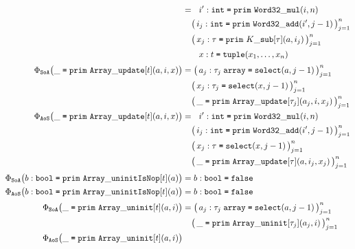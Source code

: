 \begin{figure}[htbp]
\[\begin{aligned}
      &= \phantom{\big(\,} i' : \mathtt{int} \syneq \mathtt{prim\ Word32\_mul}(i, n) \\
      &\phantom{{}=} \big(\, i_j : \mathtt{int} \syneq \mathtt{prim\ Word32\_add}(i', j-1) \,\big)_{j=1}^{n} \\
      &\phantom{{}=} \big(\, x_j : \tau \syneq \mathtt{prim}\ K\mathtt{\_sub}[\tau](a, i_j) \,\big)_{j=1}^{n} \\
      &\phantom{{}= \big(\,} x : t \syneq \mathtt{tuple}(x_1, \dots, x_n) \\[2pt]
    \Phi_{\texttt{SoA}}\big(\mathtt{\_} \syneq \mathtt{prim\ Array\_update}[t](a, i, x)\big)
      &= \big(\, a_j : \tau_j\;\mathtt{array} \syneq \mathtt{select}(a, j-1) \,\big)_{j=1}^{n} \\
      &\phantom{{}=} \big(\, x_j : \tau_j \syneq \mathtt{select}(x, j-1) \,\big)_{j=1}^{n} \\
      &\phantom{{}=} \big(\, \mathtt{\_} \syneq \mathtt{prim\ Array\_update}[\tau_j](a_j, i, x_j) \,\big)_{j=1}^{n} \\
    \Phi_{\texttt{AoS}}\big(\mathtt{\_} \syneq \mathtt{prim\ Array\_update}[t](a, i, x)\big)
      &= \phantom{\big(\,} i' : \mathtt{int} \syneq \mathtt{prim\ Word32\_mul}(i, n) \\
      &\phantom{{}=} \big(\, i_j : \mathtt{int} \syneq \mathtt{prim\ Word32\_add}(i', j-1) \,\big)_{j=1}^{n} \\
      &\phantom{{}=} \big(\, x_j : \tau \syneq \mathtt{select}(x, j-1) \,\big)_{j=1}^{n} \\
      &\phantom{{}=} \big(\, \mathtt{\_} \syneq \mathtt{prim\ Array\_update}[\tau](a, i_j, x_j) \,\big)_{j=1}^{n} \\[2pt]
    \Phi_{\texttt{SoA}}\big(b : \mathtt{bool} \syneq \mathtt{prim\ Array\_uninitIsNop}[t](a)\big)
      &= b : \mathtt{bool} \syneq \mathtt{false} \\
    \Phi_{\texttt{AoS}}\big(b : \mathtt{bool} \syneq \mathtt{prim\ Array\_uninitIsNop}[t](a)\big)
      &= b : \mathtt{bool} \syneq \mathtt{false} \\[2pt]
    \Phi_{\texttt{SoA}}\big(\mathtt{\_} \syneq \mathtt{prim\ Array\_uninit}[t](a, i)\big)
      &= \big(\, a_j : \tau_j\;\mathtt{array} \syneq \mathtt{select}(a, j-1) \,\big)_{j=1}^{n} \\
      &\phantom{{}=} \big(\, \mathtt{\_} \syneq \mathtt{prim\ Array\_uninit}[\tau_j](a_j, i) \,\big)_{j=1}^{n} \\
    \Phi_{\texttt{AoS}}\big(\mathtt{\_} \syneq \mathtt{prim\ Array\_uninit}[t](a, i)\big)

\end{aligned}\]
\end{figure}
